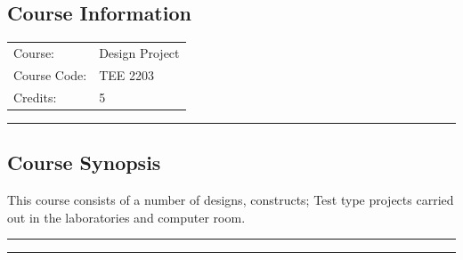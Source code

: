 
\subsection*{Course Information}
\vspace{0ex}%
\noindent\parbox{0.5\textwidth}{%
    \noindent\begin{tabular}{@{}ll}
                 \textsf{Course:}          & 	Design Project \\
                 \textsf{Course Code:}         & 	TEE 2203 \\
                 \textsf{Credits:}    & 	5
    \end{tabular}}
\vspace{2ex}\hrule\vspace{2ex}


\subsection*{Course Synopsis}
This course consists of a number of designs, constructs; Test type projects carried out in the laboratories and computer room.
\vspace{2ex}\hrule
\vspace{2ex}\hrule\vspace{2ex}